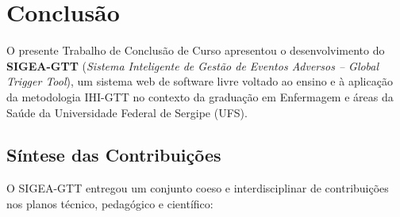 \chapter{Conclusão}
\label{cap_conclusao}

O presente Trabalho de Conclusão de Curso apresentou o desenvolvimento
do \textbf{SIGEA-GTT} (\textit{Sistema Inteligente de Gestão de Eventos
Adversos – Global Trigger Tool}), um sistema web de software livre voltado
ao ensino e à aplicação da metodologia IHI-GTT no contexto da graduação em
Enfermagem e áreas da Saúde da Universidade Federal de Sergipe (UFS).

\section{Síntese das Contribuições}
\label{sec_contribuicoes}

O SIGEA-GTT entregou um conjunto coeso e interdisciplinar de contribuições
nos planos técnico, pedagógico e científico:

